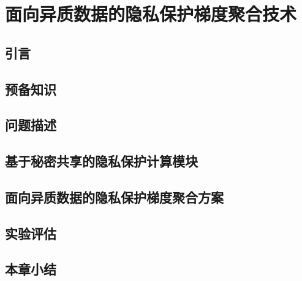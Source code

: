 \chapter{面向异质数据的隐私保护梯度聚合技术}

\section{引言}

\section{预备知识}

\section{问题描述}

\section{基于秘密共享的隐私保护计算模块}

\section{面向异质数据的隐私保护梯度聚合方案}

\section{实验评估}

\section{本章小结}